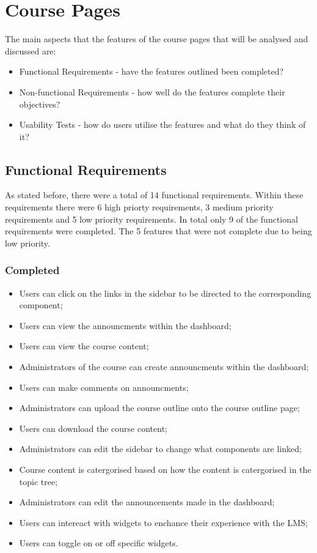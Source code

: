 \section{Course Pages}

The main aspects that the features of the course pages that will be analysed and discussed are:
\begin{itemize}
    \item Functional Requirements - have the features outlined been completed?
    \item Non-functional Requirements - how well do the features complete their objectives?
    \item Usability Tests - how do users utilise the features and what do they think of it?
\end{itemize}

\subsection{Functional Requirements}
As stated before, there were a total of 14 functional requirements. Within these requirements there were 6 high priorty requirements, 3 medium priority requirements and 5 low priority requirements.
In total only 9 of the functional requirements were completed. The 5 features that were not complete due to being low priority.

\subsubsection{Completed}
\begin{itemize}
    \item Users can click on the links in the sidebar to be directed to the corresponding component;
    \item Users can view the announcments within the dashboard;
    \item Users can view the course content;
    \item Administrators of the course can create announcments within the dashboard;
    \item Users can make comments on announcments;
    \item Administrators can upload the course outline onto the course outline page;
    \item Users can download the course content;
    \item Administrators can edit the sidebar to change what components are linked;
    \item Course content is catergorised based on how the content is catergorised in the topic tree;
    \item Administrators can edit the announcements made in the dashboard;
    \item Users can intereact with widgets to enchance their experience with the LMS;
    \item Users can toggle on or off specific widgets.
\end{itemize}

